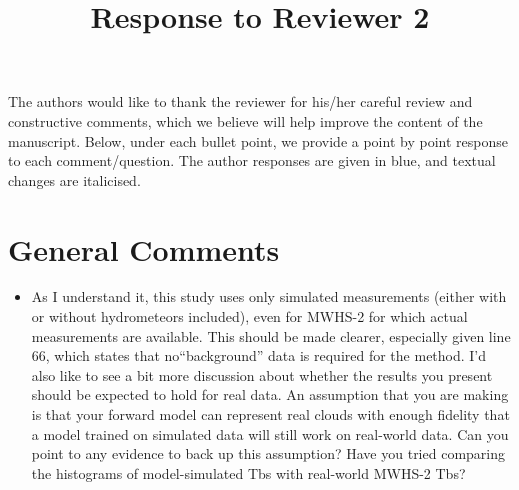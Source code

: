 \documentclass[11pt,a4paper]{article}
\begin{document}
\title{\textbf{Response to Reviewer 2}}
\date{}
\maketitle	

The authors would like to thank the reviewer for his/her careful review and constructive comments, which we believe will help improve the content of the manuscript.  Below, under each bullet point, we provide a point by point response to each comment/question. The author responses are given in blue, and textual changes are italicised.  

\section*{General Comments}
\begin{itemize}

\item 			
			As I understand it, this study uses only simulated measurements (either with or without hydrometeors included), even for MWHS-2 for which actual measurements are available. This should be made clearer, especially given line 66, which states that no``background'' data is required for the method. I'd also like to see a bit more discussion 	about whether the results you present should be expected to hold for real data. An assumption that you are making is that your forward model can represent real clouds with enough fidelity that a model trained on simulated data will still work on real-world data. Can you point to any evidence to back up this assumption? Have you tried comparing the histograms of model-simulated Tbs with real-world MWHS-2 Tbs?\\



\end{itemize}
\end{document}

